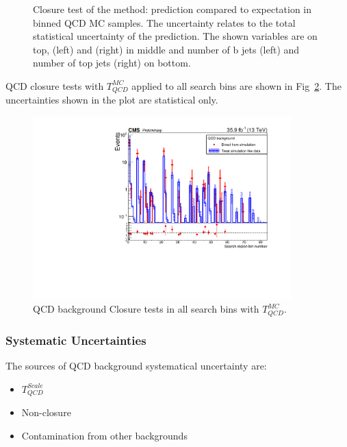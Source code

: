 \begin{figure}[hp]
\begin{center}
\begin{tabular}{cc}
\end{tabular}
\end{center}
\caption{Closure test of the method: prediction compared to expectation in \HT
binned QCD MC samples. The uncertainty relates to the total statistical uncertainty of the prediction. 
The shown variables are \MET on top, \MTTwo (left) and \HT (right) in middle 
and number of b jets (left) and number of top jets (right) on bottom.}
\label{fig:ClorureTestQCD}
\end{figure}

QCD closure tests with $T_{QCD}^{MC}$ applied to all search bins are shown in
Fig~\ref{fig:SBClosure}. The uncertainties shown in the plot are statistical only.
\begin{figure}[htbp]
\begin{center}
\includegraphics[width=0.89\textwidth]{sections/mc4/Backgrounds/QCD/figures/84sb/_sb.pdf}
\end{center}\caption{QCD background Closure tests in all search bins with $T_{QCD}^{MC}$.}
\label{fig:SBClosure}
\end{figure}

\subsubsection{Systematic Uncertainties}

The sources of QCD background systematical uncertainty are:

\begin{itemize}
\item $T_{QCD}^{Scale}$
\item Non-closure
\item Contamination from other backgrounds
\end{itemize}

